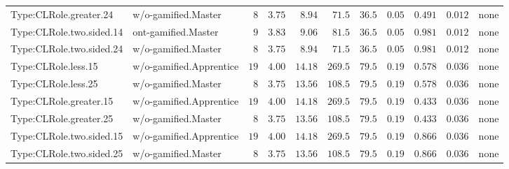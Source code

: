\documentclass[6pt,a4paper]{article}
\begin{document}
{\begin{longtable}{llrrrrrrrrl}
Type:CLRole.greater.24&w/o-gamified.Master&$ 8$&$3.75$&$ 8.94$&$ 71.5$&$ 36.5$&$ 0.05$&$0.491$&$0.012$&none\tabularnewline
Type:CLRole.two.sided.14&ont-gamified.Master&$ 9$&$3.83$&$ 9.06$&$ 81.5$&$ 36.5$&$ 0.05$&$0.981$&$0.012$&none\tabularnewline
Type:CLRole.two.sided.24&w/o-gamified.Master&$ 8$&$3.75$&$ 8.94$&$ 71.5$&$ 36.5$&$ 0.05$&$0.981$&$0.012$&none\tabularnewline
Type:CLRole.less.15&w/o-gamified.Apprentice&$19$&$4.00$&$14.18$&$269.5$&$ 79.5$&$ 0.19$&$0.578$&$0.036$&none\tabularnewline
Type:CLRole.less.25&w/o-gamified.Master&$ 8$&$3.75$&$13.56$&$108.5$&$ 79.5$&$ 0.19$&$0.578$&$0.036$&none\tabularnewline
Type:CLRole.greater.15&w/o-gamified.Apprentice&$19$&$4.00$&$14.18$&$269.5$&$ 79.5$&$ 0.19$&$0.433$&$0.036$&none\tabularnewline
Type:CLRole.greater.25&w/o-gamified.Master&$ 8$&$3.75$&$13.56$&$108.5$&$ 79.5$&$ 0.19$&$0.433$&$0.036$&none\tabularnewline
\newpage
Type:CLRole.two.sided.15&w/o-gamified.Apprentice&$19$&$4.00$&$14.18$&$269.5$&$ 79.5$&$ 0.19$&$0.866$&$0.036$&none\tabularnewline
Type:CLRole.two.sided.25&w/o-gamified.Master&$ 8$&$3.75$&$13.56$&$108.5$&$ 79.5$&$ 0.19$&$0.866$&$0.036$&none\tabularnewline
\hline
\end{longtable}}
\end{document}

